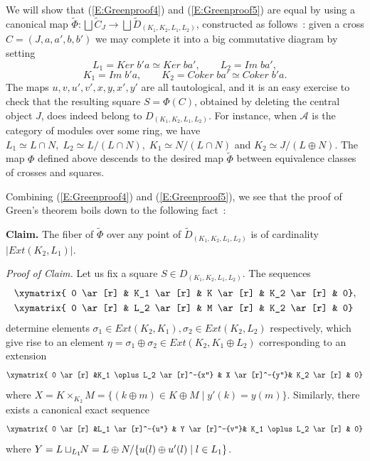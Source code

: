 \documentclass[a4paper,10pt]{amsart}
\numberwithin{equation}{section}
\begin{document}
\vspace{.1in}

We will show that (\ref{E:Greenproof4}) and (\ref{E:Greenproof5}) are equal by using a canonical map $\widetilde{\Phi}: \bigsqcup \widetilde{C}_J \to \bigsqcup \widetilde{D}_{(K_1, K_2, L_1, L_2)}$, constructed as follows~: given a cross $C=(J,a,a',b,b')$ we may complete it into a big commutative diagram by setting
$$L_1={Ker}\; b'a \simeq {Ker}\; ba', \qquad L_2={Im}\;ba', $$
$$ K_1={Im}\;b'a, \qquad K_2={Coker}\; ba' \simeq {Coker}\;b'a.$$
The maps $u,v,u',v',x,y,x',y'$ are all tautological, and it is an easy exercise to check that the resulting square $S=\Phi(C)$, obtained by deleting the central object $J$, does indeed belong to
${D}_{(K_1,K_2,L_1,L_2)}$. For instance, when $\mathcal{A}$ is the category of modules over some ring, we have $L_1 \simeq L\cap N, \;L_2 \simeq L/(L\cap N), \;K_1\simeq N/(L \cap N)$ and $K_2 \simeq J/(L \oplus N)$. The map $\Phi$ defined above descends to the desired map $\widetilde{\Phi}$ between equivalence classes of crosses and squares.

Combining (\ref{E:Greenproof4}) and (\ref{E:Greenproof5}), we see that the proof of Green's theorem boils down to the following fact~:

\vspace{.05in}

\noindent
\textbf{Claim.} The fiber of $\widetilde{\Phi}$ over any point of $\widetilde{D}_{(K_1, K_2, L_1, L_2)}$ is of cardinality $|{Ext}(K_2,L_1)|$.

\vspace{.05in}

\noindent
\textit{Proof of Claim.} Let us fix a square $S \in D_{(K_1, K_2, L_1, L_2)}$. The sequences
\begin{align*}
&\xymatrix{ 0 \ar[r] & K_1 \ar[r] & K \ar[r] & K_2 \ar[r] & 0},\\
&\xymatrix{ 0 \ar[r] & L_2 \ar[r] & M \ar[r] & K_2 \ar[r] & 0}
\end{align*}
determine elements $\sigma_1 \in {Ext}(K_2,K_1), \sigma_2 \in {Ext}(K_2,L_2)$ respectively, which give rise to an element $\eta=\sigma_1\oplus\sigma_2 \in {Ext}(K_2, K_1 \oplus L_2)$ corresponding to an extension
$$\xymatrix{ 0 \ar[r] &K_1 \oplus L_2 \ar[r]^-{x''} & X \ar[r]^-{y''}& K_2 \ar[r] & 0}$$
where $X=K \times_{K_2} M =\{(k \oplus m) \in K \oplus M\;|\; y'(k)=y(m)\}$. Similarly, there exists a canonical exact sequence
$$\xymatrix{ 0 \ar[r] &L_1 \ar[r]^-{u''} & Y \ar[r]^-{v''}& K_1 \oplus L_2 \ar[r] & 0}$$
where $Y=L \sqcup_{\small{L_1}} \hspace{-.05in}N =L \oplus N / \{u(l)\oplus u'(l)\;|\;l \in L_1\}$.
\end{document}
